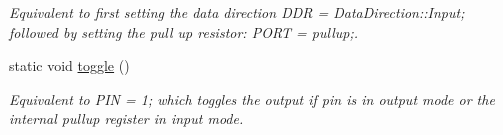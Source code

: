 \begin{DoxyCompactItemize}
\begin{DoxyCompactList}\small\item\em Equivalent to first setting the data direction {\ttfamily D\+DR = Data\+Direction\+::\+Input;} followed by setting the pull up resistor\+: {\ttfamily P\+O\+RT = pullup;}. \end{DoxyCompactList}\item 
static void \hyperlink{structports_1_1Pin_a3caf6009548ed46020910f36d2b0f4f9}{toggle} ()\hypertarget{structports_1_1Pin_a3caf6009548ed46020910f36d2b0f4f9}{}\label{structports_1_1Pin_a3caf6009548ed46020910f36d2b0f4f9}

\begin{DoxyCompactList}\small\item\em Equivalent to {\ttfamily P\+IN = 1;} which toggles the output if pin is in output mode or the internal pullup register in input mode. \end{DoxyCompactList}\end{DoxyCompactItemize}
